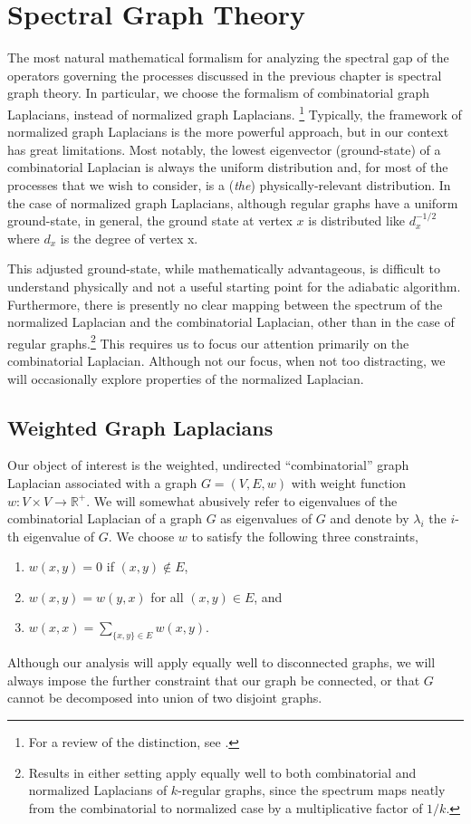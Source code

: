 \chapter{Spectral Graph Theory}

  The most natural mathematical formalism for analyzing the spectral gap of the operators governing the processes discussed in the previous chapter is spectral graph theory. In particular, we choose the formalism of combinatorial graph Laplacians, instead of normalized graph Laplacians. \footnote{For a review of the distinction, see \cite{Chung}.} Typically, the framework of normalized graph Laplacians is the more powerful approach, but in our context has great limitations. Most notably, the lowest eigenvector (ground-state) of a combinatorial Laplacian is always the uniform distribution and, for most of the processes that we wish to consider, is a (\textit{the}) physically-relevant distribution. In the case of normalized graph Laplacians, although regular graphs have a uniform ground-state, in general, the ground state at vertex $x$ is distributed like $d_x^{-1/2}$ where $d_x$ is the degree of vertex x.
  
  This adjusted ground-state, while mathematically advantageous, is difficult to understand physically and not a useful starting point for the adiabatic algorithm. Furthermore, there is presently no clear mapping between the spectrum of the normalized Laplacian and the combinatorial Laplacian, other than in the case of regular graphs.\footnote{Results in either setting apply equally well to both combinatorial and normalized Laplacians of $k$-regular graphs, since the spectrum maps neatly from the combinatorial to normalized case by a multiplicative factor of $1/k$.} This requires us to focus our attention primarily on the combinatorial Laplacian. Although not our focus, when not too distracting, we will occasionally explore properties of the normalized Laplacian.
  
  
\section{Weighted Graph Laplacians}
  Our object of interest is the weighted, undirected ``combinatorial'' graph Laplacian associated with a graph $G = (V,E,w)$ with weight function $w:V\times V \rightarrow \mathbb{R}^+$. We will somewhat abusively refer to eigenvalues of the combinatorial Laplacian of a graph $G$ as eigenvalues of $G$ and denote by $\lambda_i$ the $i$-th eigenvalue of $G$. We choose $w$ to satisfy the following three constraints,
  \begin{enumerate}
      \item $w(x,y) = 0$ if $(x,y) \notin E$,
      \item $w(x,y) = w(y,x)$ for all $(x,y) \in E$, and
      \item $w(x,x) = \sum_{\{x,y\} \in E} w(x,y)$.
  \end{enumerate}
  Although our analysis will apply equally well to disconnected graphs, we will always impose the further constraint that our graph be connected, or that $G$ cannot be decomposed into union of two disjoint graphs.
  
